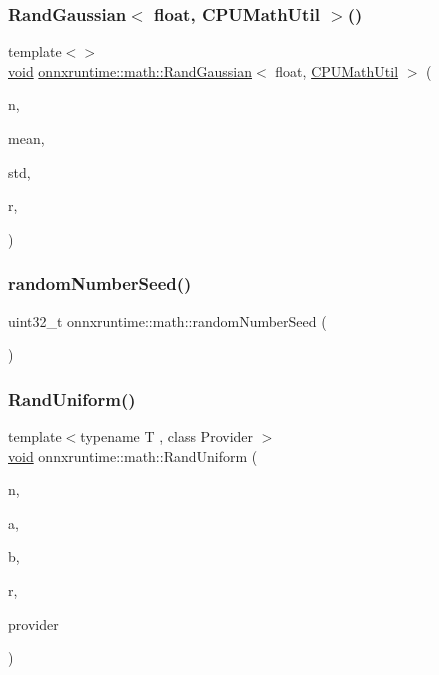 \subsubsection{\texorpdfstring{Rand\+Gaussian$<$ float, C\+P\+U\+Math\+Util $>$()}{RandGaussian< float, CPUMathUtil >()}}
{\footnotesize\ttfamily template$<$$>$ \\
\mbox{\hyperlink{mlasi_8h_a88f941d423cb2a819b70a1358982b1a6}{void}} \mbox{\hyperlink{namespaceonnxruntime_1_1math_a0bd243f8f7a07f1c3abd19a645e9b2cd}{onnxruntime\+::math\+::\+Rand\+Gaussian}}$<$ float, \mbox{\hyperlink{classonnxruntime_1_1CPUMathUtil}{C\+P\+U\+Math\+Util}} $>$ (\begin{DoxyParamCaption}\item[{const int}]{n,  }\item[{const float}]{mean,  }\item[{const float}]{std,  }\item[{float $\ast$}]{r,  }\item[{\mbox{\hyperlink{classonnxruntime_1_1CPUMathUtil}{C\+P\+U\+Math\+Util}} $\ast$}]{ }\end{DoxyParamCaption})}

\mbox{\label{namespaceonnxruntime_1_1math_a4aa5e50c4fa1e17ef92e533310f6d3f7}} 
\subsubsection{\texorpdfstring{random\+Number\+Seed()}{randomNumberSeed()}}
{\footnotesize\ttfamily uint32\+\_\+t onnxruntime\+::math\+::random\+Number\+Seed (\begin{DoxyParamCaption}{ }\end{DoxyParamCaption})}

\mbox{\label{namespaceonnxruntime_1_1math_add24214b0bdbbeb482af602e0811f4a5}} 
\subsubsection{\texorpdfstring{Rand\+Uniform()}{RandUniform()}}
{\footnotesize\ttfamily template$<$typename T , class Provider $>$ \\
\mbox{\hyperlink{mlasi_8h_a88f941d423cb2a819b70a1358982b1a6}{void}} onnxruntime\+::math\+::\+Rand\+Uniform (\begin{DoxyParamCaption}\item[{const int}]{n,  }\item[{const T}]{a,  }\item[{const T}]{b,  }\item[{T $\ast$}]{r,  }\item[{Provider $\ast$}]{provider }\end{DoxyParamCaption})}

